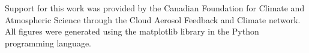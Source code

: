 \documentclass[draft,grl]{agutex}
\begin{document}
\begin{article}
%
%
%
%

\begin{acknowledgments}
Support for this work was provided by the Canadian Foundation for Climate and 
Atmospheric Science through the Cloud Aerosol Feedback and Climate network.
All figures were generated using the matplotlib library in the Python
programming language.
\end{acknowledgments}

%
%
%
%
%
%
%
%
%
%








\end{article}
\end{document}
